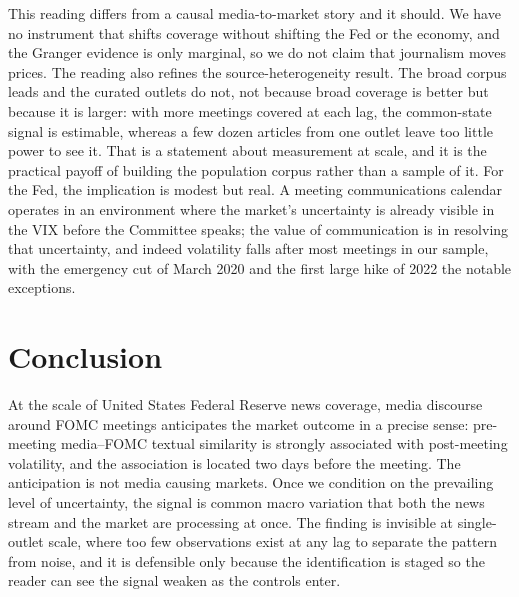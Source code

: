 \documentclass[11pt,a4paper]{article}
\begin{document}
This reading differs from a causal media-to-market story and it should. We have no
instrument that shifts coverage without shifting the Fed or the economy, and the
Granger evidence is only marginal, so we do not claim that journalism moves prices.
The reading also refines the source-heterogeneity result. The broad corpus leads
and the curated outlets do not, not because broad coverage is better but because it
is larger: with more meetings covered at each lag, the common-state signal is
estimable, whereas a few dozen articles from one outlet leave too little power to
see it. That is a statement about measurement at scale, and it is the practical
payoff of building the population corpus rather than a sample of it. For the Fed,
the implication is modest but real. A meeting communications calendar operates in
an environment where the market's uncertainty is already visible in the VIX before
the Committee speaks; the value of communication is in resolving that uncertainty,
and indeed volatility falls after most meetings in our sample, with the emergency
cut of March 2020 and the first large hike of 2022 the notable exceptions.

\section{Conclusion}
\label{sec:conclusion}

At the scale of United States Federal Reserve news coverage, media discourse
around FOMC meetings anticipates the market outcome in a precise sense: pre-meeting
media--FOMC textual similarity is strongly associated with post-meeting volatility,
and the association is located two days before the meeting. The anticipation is not
media causing markets. Once we condition on the prevailing level of uncertainty,
the signal is common macro variation that both the news stream and the market are
processing at once. The finding is invisible at single-outlet scale, where too few
observations exist at any lag to separate the pattern from noise, and it is
defensible only because the identification is staged so the reader can see the
signal weaken as the controls enter.
\end{document}
